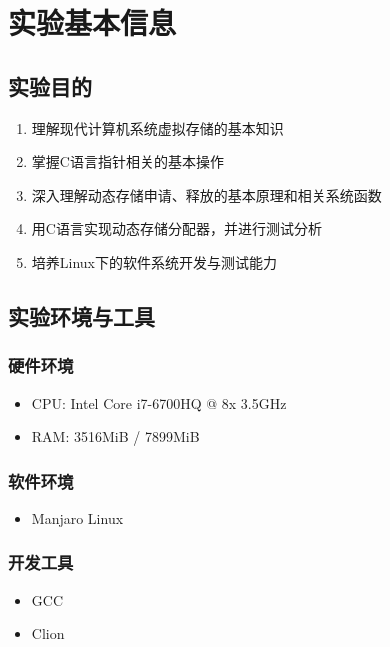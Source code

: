 \section{实验基本信息}

\subsection{实验目的}
\begin{enumerate}
    \item 理解现代计算机系统虚拟存储的基本知识
    \item 掌握C语言指针相关的基本操作
    \item 深入理解动态存储申请、释放的基本原理和相关系统函数
    \item 用C语言实现动态存储分配器，并进行测试分析
    \item 培养Linux下的软件系统开发与测试能力
\end{enumerate}

\subsection{实验环境与工具}

\subsubsection{硬件环境}
\begin{itemize}
    \item CPU: Intel Core i7-6700HQ @ 8x 3.5GHz
    \item RAM: 3516MiB / 7899MiB
\end{itemize}

\subsubsection{软件环境}
\begin{itemize}
    \item Manjaro Linux

\end{itemize}

\subsubsection{开发工具}
\begin{itemize}
    \item GCC
    \item Clion
\end{itemize}